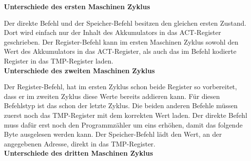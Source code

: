 \documentclass[12pt]{article}
\begin{document}
\noindent
\textbf{Unterschiede des ersten Maschinen Zyklus}

\noindent
Der direkte Befehl und der Speicher-Befehl besitzen den gleichen ersten Zustand. Dort wird einfach nur der Inhalt des Akkumulators in das ACT-Register geschrieben.
Der Register-Befehl kann im ersten Maschinen Zyklus sowohl den Wert des Akkumulators in das ACT-Register, als auch das im Befehl kodierte Register in das TMP-Register laden.
\\

\noindent
\textbf{Unterschiede des zweiten Maschinen Zyklus}

\noindent
Der Register-Befehl, hat im ersten Zyklus schon beide Register so vorbereitet, dass er im zweiten Zyklus diese Werte bereits addieren kann. Für diesen Befehlstyp ist das schon der letzte Zyklus.
Die beiden anderen Befehle müssen zuerst noch das TMP-Register mit dem korrekten Wert laden. Der direkte Befehl muss dafür erst noch den Programmzähler um eins erhöhen, damit das folgende Byte ausgelesen werden kann. Der Speicher-Befehl lädt den Wert, an der angegebenen Adresse, direkt in das TMP-Register.
\\

\noindent
\textbf{Unterschiede des dritten Maschinen Zyklus}
\end{document}
